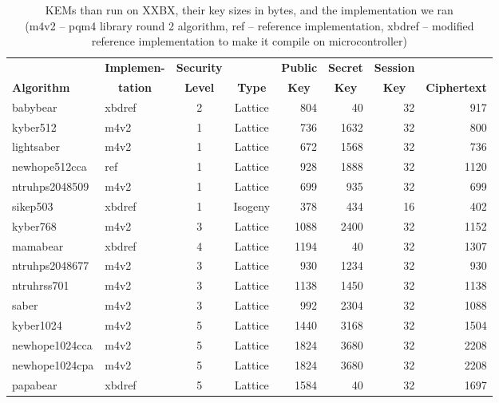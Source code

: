 \documentclass[10pt]{article}
\newcommand{\thb}[1]{\multicolumn{1}{c}{\textbf{#1}}}
\newcommand{\thbr}[1]{\multicolumn{1}{c|}{\textbf{#1}}}
\begin{document}
\begin{table}[ht]
  \centering
  \caption{KEMs than run on XXBX, their key sizes in bytes, and the implementation we ran\\
     {(\small m4v2 -- pqm4 library round 2 algorithm, ref -- reference implementation,
      xbdref -- modified reference implementation to make it compile on microcontroller)}}\label{tab:sizeskem}
    \begin{tabular}{ll|c|c|rrrr}
                   & \textbf{Implemen-} & \textbf{Security} &             & \textbf{Public} & \textbf{Secret} & \textbf{Session} & \\ 
\textbf{Algorithm} & \thbr{tation}    &\textbf{Level} & \textbf{Type} & \thb{Key} & \thb{Key} & \thb{Key} & \textbf{Ciphertext} \\ \hline
babybear	& xbdref & 2	         & Lattice &  804       &   40       & 32          &  917 \\
kyber512	& m4v2   & 1	         & Lattice &  736       & 1632       & 32          &  800 \\
lightsaber	& m4v2   & 1	         & Lattice &  672       & 1568       & 32          &  736 \\
newhope512cca	& ref    & 1	         & Lattice &  928       & 1888       & 32          & 1120 \\
ntruhps2048509  & m4v2   & 1             & Lattice &  699       &  935       & 32          &  699 \\
sikep503	& xbdref & 1	         & Isogeny &  378       &  434       & 16          &  402 \\
kyber768	& m4v2   & 3	         & Lattice & 1088       & 2400       & 32          & 1152 \\
mamabear	& xbdref & 4	         & Lattice & 1194       &   40       & 32          & 1307 \\
ntruhps2048677  & m4v2   & 3             & Lattice &  930       & 1234       & 32          &  930 \\
ntruhrss701     & m4v2   & 3             & Lattice & 1138       & 1450       & 32          & 1138 \\
saber    	& m4v2   & 3	         & Lattice &  992       & 2304       & 32          & 1088 \\
kyber1024	& m4v2   & 5	         & Lattice & 1440       & 3168       & 32          & 1504 \\
newhope1024cca	& m4v2   & 5	         & Lattice & 1824       & 3680       & 32          & 2208 \\
newhope1024cpa	& m4v2   & 5	         & Lattice & 1824       & 3680       & 32          & 2208 \\
papabear	& xbdref & 5	         & Lattice & 1584       &   40       & 32          & 1697 \\
    \end{tabular}
\end{table}
\end{document}
